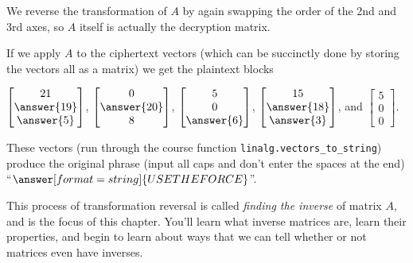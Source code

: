 \documentclass{ximera}
\begin{document}
\begin{example}
  We reverse the transformation of $A$ by again swapping the order of the 2nd and 3rd axes, so $A$ itself is actually the decryption matrix.

  If we apply $A$ to the ciphertext vectors (which can be succinctly done by storing the vectors all as a matrix) we get the plaintext blocks 

  $\begin{bmatrix}
    21 \\
    \answer{19}\\
    \answer{5}\end{bmatrix}$, 
    $\begin{bmatrix}
    0 \\
    \answer{20}
    \\8\end{bmatrix}$, 
    $\begin{bmatrix}
    5\\0\\
    \answer{6}\end{bmatrix}$, 
    $\begin{bmatrix}
    15\\
    \answer{18}\\
    \answer{3}\end{bmatrix}$, 
    and $\begin{bmatrix}
    5\\0\\0\end{bmatrix}$.

  These vectors (run through the course function \texttt{linalg.vectors\_to\_string}) produce the original phrase (input all caps and don't enter the spaces at the end) ``$\answer[format=string]{USE THE FORCE}$''.

\end{example}

This process of transformation reversal is called \emph{finding the inverse} of matrix $A$, and is the focus of this chapter. You'll learn what inverse matrices are, learn their properties, and begin to learn about ways that we can tell whether or not matrices even have inverses.
\end{document}

